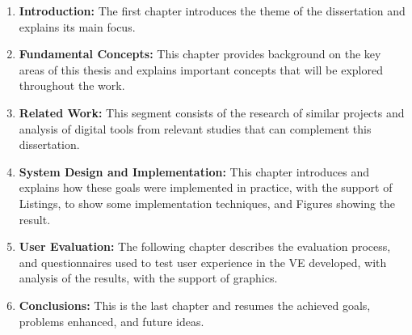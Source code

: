 \begin{enumerate}
  \item \textbf{Introduction:} The first chapter introduces the theme of the dissertation and explains its main focus.
  
  \item \textbf{Fundamental Concepts:} This chapter provides background on the key areas of this thesis and explains important concepts that will be explored throughout the work.
  
  \item \textbf{Related Work:} This segment consists of the research of similar projects and analysis of digital tools from relevant studies that can complement this dissertation.

  \item \textbf{System Design and Implementation:} This chapter introduces and explains how these goals were implemented in practice, with the support of Listings, to show some implementation techniques, and Figures showing the result.
  
  \item \textbf{User Evaluation:} The following chapter describes the evaluation process, and questionnaires used to test user experience in the \gls{VE} developed, with analysis of the results, with the support of graphics.
  
  \item \textbf{Conclusions:} This is the last chapter and resumes the achieved goals, problems enhanced, and future ideas. 
\end{enumerate}
